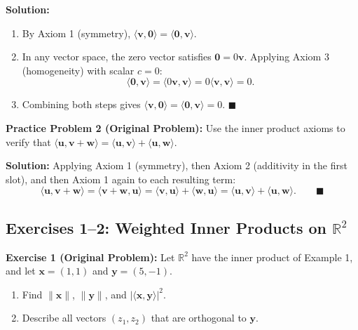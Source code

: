 \documentclass[11pt, letterpaper]{article}
\theoremstyle{definition}
\theoremstyle{remark}
\begin{document}
\textbf{Solution:}
\begin{enumerate}
    \item By Axiom 1 (symmetry), $\langle \mathbf{v}, \mathbf{0} \rangle = \langle \mathbf{0}, \mathbf{v} \rangle$.
    \item In any vector space, the zero vector satisfies $\mathbf{0} = 0\mathbf{v}$. Applying Axiom 3 (homogeneity) with scalar $c = 0$:
    \[
        \langle \mathbf{0}, \mathbf{v} \rangle = \langle 0\mathbf{v}, \mathbf{v} \rangle = 0\langle \mathbf{v}, \mathbf{v} \rangle = 0.
    \]
    \item Combining both steps gives $\langle \mathbf{v}, \mathbf{0} \rangle = \langle \mathbf{0}, \mathbf{v} \rangle = 0$. \hfill $\blacksquare$
\end{enumerate}

\textbf{Practice Problem 2 (Original Problem):} Use the inner product axioms to verify that $\langle \mathbf{u}, \mathbf{v} + \mathbf{w} \rangle = \langle \mathbf{u}, \mathbf{v} \rangle + \langle \mathbf{u}, \mathbf{w} \rangle$.

\textbf{Solution:}
Applying Axiom 1 (symmetry), then Axiom 2 (additivity in the first slot), and then Axiom 1 again to each resulting term:
\[
    \langle \mathbf{u}, \mathbf{v} + \mathbf{w} \rangle = \langle \mathbf{v} + \mathbf{w}, \mathbf{u} \rangle = \langle \mathbf{v}, \mathbf{u} \rangle + \langle \mathbf{w}, \mathbf{u} \rangle = \langle \mathbf{u}, \mathbf{v} \rangle + \langle \mathbf{u}, \mathbf{w} \rangle. \qquad \blacksquare
\]

\subsection{Exercises 1--2: Weighted Inner Products on $\mathbb{R}^2$}

\textbf{Exercise 1 (Original Problem):} Let $\mathbb{R}^2$ have the inner product of Example 1, and let $\mathbf{x} = (1, 1)$ and $\mathbf{y} = (5, -1)$.
\begin{enumerate}[label=\textbf{\alph*.}]
    \item Find $\|\mathbf{x}\|$, $\|\mathbf{y}\|$, and $|\langle \mathbf{x}, \mathbf{y} \rangle|^2$.
    \item Describe all vectors $(z_1, z_2)$ that are orthogonal to $\mathbf{y}$.
\end{enumerate}
\end{document}
